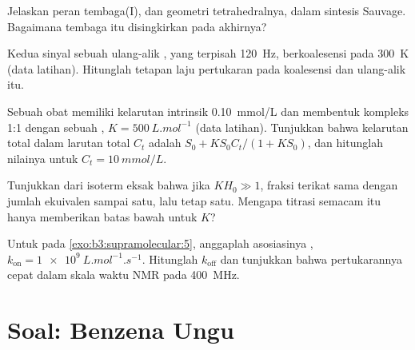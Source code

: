 \begin{exercise}[$\star\star$]\label{exo:b3:supramolecular:8}
Jelaskan peran tembaga(I), dan geometri tetrahedralnya, dalam sintesis 
Sauvage. Bagaimana tembaga itu disingkirkan pada akhirnya?
\end{exercise}

\begin{exercise}[$\star\star$]\label{exo:b3:supramolecular:9}
Kedua sinyal sebuah ulang-alik , yang terpisah \qty{120}{Hz}, berkoalesensi pada \qty{300}{K} (data
latihan). Hitunglah tetapan laju pertukaran pada koalesensi dan  ulang-alik itu.
\end{exercise}

\begin{exercise}[$\star\star\star$]\label{exo:b3:supramolecular:10}
Sebuah obat memiliki kelarutan intrinsik \qty{0.10}{mmol/L} dan membentuk kompleks 1:1 dengan sebuah
, $K = \qty{500}{L.mol^{-1}}$ (data latihan). Tunjukkan bahwa kelarutan total dalam
larutan  total $C_t$ adalah $S_0 + KS_0C_t/(1 + KS_0)$, dan hitunglah nilainya untuk $C_t = \qty{10}{mmol/L}$.
\end{exercise}

\begin{exercise}[$\star\star\star$]\label{exo:b3:supramolecular:11}
Tunjukkan dari isoterm eksak bahwa jika $KH_0 \gg 1$, fraksi terikat sama dengan
jumlah ekuivalen sampai satu, lalu tetap satu. Mengapa titrasi semacam itu
hanya memberikan batas bawah untuk $K$?
\end{exercise}

\begin{exercise}[$\star\star\star$]\label{exo:b3:supramolecular:12}
Untuk  pada \cref{exo:b3:supramolecular:5}, anggaplah asosiasinya
, $k_{\mathrm{on}} = \qty{1e9}{L.mol^{-1}.s^{-1}}$. Hitunglah $k_{\mathrm{off}}$ dan tunjukkan bahwa pertukarannya cepat dalam
skala waktu NMR pada \qty{400}{MHz}.
\end{exercise}

\section{Soal: Benzena Ungu}

